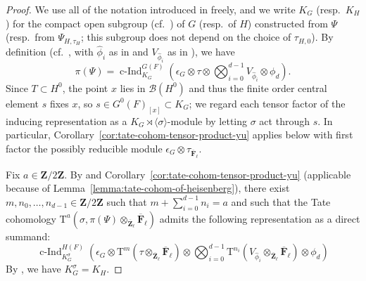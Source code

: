 \documentclass[reqno]{amsart}
\numberwithin{equation}{subsection}
\newcommand{\F}{\mathbf{F}}
\newcommand{\Z}{\mathbf{Z}}
\newcommand{\ol}[1]{\overline{#1}}
\newcommand{\wh}[1]{\widehat{#1}}
\newcommand\cB{\mathcal{B}}
\DeclareMathOperator{\cInd}{c-Ind}
\newcommand{\rT}{\ensuremath{\mathrm{T}}\xspace}
\theoremstyle{remark}
\numberwithin{equation}{subsection}
\numberwithin{figure}{subsection}
\begin{document}
\begin{proof}
We use all of the notation introduced in \cite[\S 6]{CF26a} freely, and we write $K_G$ (resp.\ $K_H$) for the compact open subgroup (cf.\ \cite[(6.2.1)]{CF26a}) of $G$ (resp.\ of $H$) constructed from $\Psi$ (resp.\ from $\Psi_{H,\tau_H}$; this subgroup does not depend on the choice of $\tau_{H,0}$). By definition (cf.\ \cite[(6.5.1)]{CF26a}, with $\wh\phi_i$ as in \cite[\S 6.2]{CF26a} and $V_{\wh\phi_i}$ as in \cite[\S 6.3]{CF26a}), we have
\[
\pi(\Psi) = \cInd_{K_G}^{G(F)}(\epsilon_G \otimes \tau \otimes \bigotimes_{i=0}^{d-1} V_{\wh\phi_i} \otimes \phi_d).
\]
Since $T \subset H^0$, the point $x$ lies in $\cB(H^0)$ and thus the finite order central element $s$ fixes $x$, so $s \in G^0(F)_{[x]} \subset K_G$; we regard each tensor factor of the inducing representation as a $K_G \rtimes \langle\sigma\rangle$-module by letting $\sigma$ act through $s$. In particular, Corollary~\ref{cor:tate-cohom-tensor-product-yu} applies below with first factor the possibly reducible module $\epsilon_G \otimes \tau_{\ol\F_\ell}$.

Fix $a \in \Z/2\Z$. By \cite[Lemma~5.2.1]{Cot26b} and Corollary~\ref{cor:tate-cohom-tensor-product-yu} (applicable because of Lemma~\ref{lemma:tate-cohom-of-heisenberg}), there exist $m, n_0,\dots,n_{d-1} \in \Z/2\Z$ such that $m + \sum_{i=0}^{d-1} n_i = a$ and such that the Tate cohomology $\rT^a(\sigma, \pi(\Psi)\otimes_{\ol\Z_\ell}\ol\F_\ell)$ admits the following representation as a direct summand:
\begin{equation}\label{eq:levi-descent-step1-summand}
\cInd_{K_G^\sigma}^{H(F)}(\epsilon_G \otimes \rT^m(\tau \otimes_{\ol\Z_\ell} \ol\F_\ell) \otimes \bigotimes_{i=0}^{d-1} \rT^{n_i}(V_{\wh\phi_i} \otimes_{\ol\Z_\ell} \ol\F_\ell) \otimes \phi_d)
\end{equation}
By \cite[Lemma~6.4.2(1)]{CF26a}, we have $K_G^\sigma = K_H$.


\end{proof}
\end{document}
